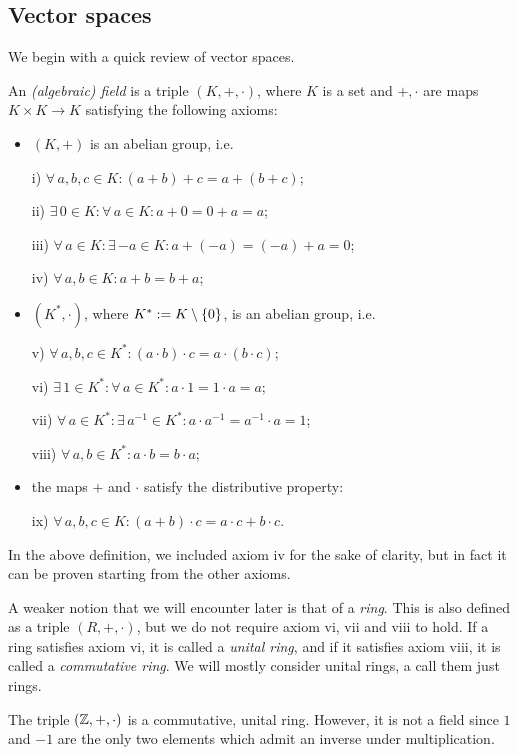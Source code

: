 \subsection{Vector spaces}

We begin with a quick review of vector spaces.

\bd
An \emph{(algebraic) field} is a triple $(K,+,\cdot)$, where $K$ is a set and $+,\cdot$ are maps $K\times K \to K$ satisfying the following axioms:
\begin{itemize}
\item $(K,+)$ is an abelian group, i.e.
\ben
\item[i)] $\forall \, a,b,c \in K : (a+b)+c=a+(b+c)$;
\item[ii)] $\exists \, 0 \in K : \forall \, a \in K : a+0=0+a=a$;
\item[iii)] $\forall \, a \in K : \exists \, {-a} \in K : a+(-a)=(-a)+a=0$;
\item[iv)] $\forall \, a,b \in K : a+b=b+a$;
\een
\item $(K^*,\cdot)$, where $K^*:=K\setminus\{0\}$, is an abelian group, i.e.
\ben
\item[v)] $\forall \, a,b,c \in K^* : (a\cdot b)\cdot c=a\cdot (b\cdot c)$;
\item[vi)] $\exists \, 1 \in K^* : \forall \, a \in K^* : a\cdot 1=1\cdot a=a$;
\item[vii)] $\forall \, a \in K^* : \exists \, a^{-1} \in K^* : a\cdot a^{-1}=a^{-1} \cdot a=1$;
\item[viii)] $\forall \, a,b \in K^* : a\cdot b=b\cdot a$;
\een
\item the maps $+$ and $\cdot$ satisfy the distributive property:
\ben
\item[ix)] $\forall \, a,b,c \in K : (a+ b)\cdot c=a\cdot c + b\cdot c$.
\een
\end{itemize}
\ed

\br
In the above definition, we included axiom iv for the sake of clarity, but in fact it can be proven starting from the other axioms.
\er

\br
A weaker notion that we will encounter later is that of a \emph{ring}. This is also defined as a triple $(R,+,\cdot)$, but we do not require axiom vi, vii and viii to hold. If a ring satisfies axiom vi, it is called a \emph{unital ring}, and if it satisfies axiom viii, it is called a \emph{commutative ring}. We will mostly consider unital rings, a call them just rings.
\er

\be
The triple $(\mathbb{Z},+,\cdot)$ is a commutative, unital ring. However, it is not a field since $1$ and $-1$ are the only two elements which admit an inverse under multiplication.
\ee

